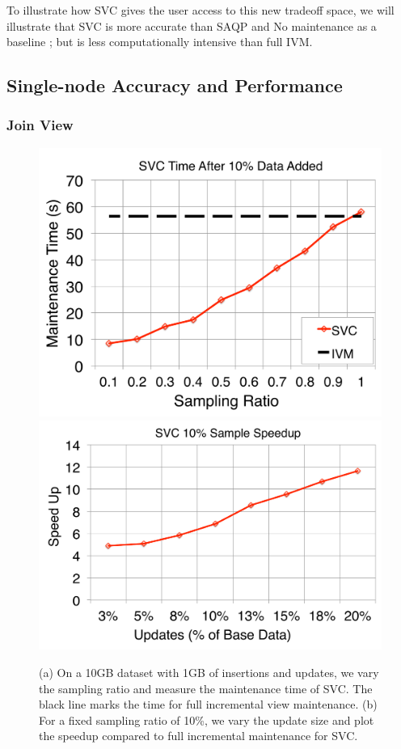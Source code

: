 To illustrate how SVC gives the user access to this new tradeoff space, we will illustrate that SVC is more accurate than SAQP and No maintenance as a baseline ; but is less computationally intensive than full IVM. 

\subsection{Single-node Accuracy and Performance}

\subsubsection{Join View}

\begin{figure}[t]
\centering
\includegraphics[scale=0.15]{exp/msj_1.pdf}
\includegraphics[scale=0.15]{exp/msj_2.pdf}
 \caption{(a) On a 10GB dataset with 1GB of insertions and updates, we vary the sampling ratio and measure the maintenance time of SVC. The black line marks the time for full incremental view maintenance. (b) For a fixed sampling ratio of 10\%, we vary the update size and plot the speedup compared to full incremental maintenance for SVC. \label{exp-1-samplesize}}
\end{figure}


